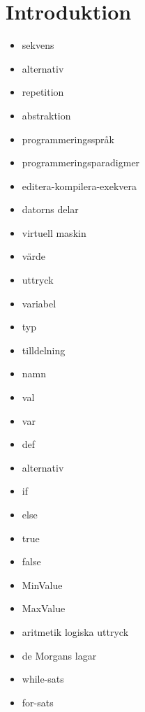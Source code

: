 \chapter{Introduktion}\label{chapter:W01}
\begin{itemize}[nosep]
\item sekvens
\item alternativ
\item repetition
\item abstraktion
\item programmeringsspråk
\item programmeringsparadigmer
\item editera-kompilera-exekvera
\item datorns delar
\item virtuell maskin
\item värde
\item uttryck
\item variabel
\item typ
\item tilldelning
\item namn
\item val
\item var
\item def
\item alternativ
\item if
\item else
\item true
\item false
\item MinValue
\item MaxValue
\item aritmetik logiska uttryck
\item de Morgans lagar
\item while-sats
\item for-sats
\end{itemize}